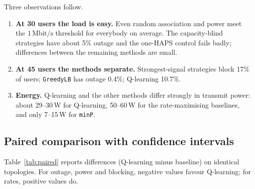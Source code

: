 \documentclass[11pt,a4paper]{article}
\newcommand{\Mbps}{\,\mathrm{Mbit/s}}
\begin{document}
Three observations follow.
\begin{enumerate}
  \item \textbf{At 30 users the load is easy.} Even random association and power meet the $1\Mbps$ threshold for everybody on average. The capacity-blind strategies have about 5\% outage and the one-HAPS control fails badly; differences between the remaining methods are small.
  \item \textbf{At 45 users the methods separate.} Strongest-signal strategies block 17\% of users; \texttt{GreedyLB} has outage 0.4\%; Q-learning 10.7\%.
  \item \textbf{Energy.} Q-learning and the other methods differ strongly in transmit power: about 29--30\,W for Q-learning, 50--60\,W for the rate-maximising baselines, and only 7--15\,W for \texttt{minP}.
\end{enumerate}

\subsection{Paired comparison with confidence intervals}
Table~\ref{tab:paired} reports differences (Q-learning minus baseline) on identical topologies. For outage, power and blocking, negative values favour Q-learning; for rates, positive values do.

\begin{table}[h]
\centering\footnotesize
{}
\caption{Paired differences, Q-learning minus baseline, mean with 95\% bootstrap CI over 30 topologies. pp = percentage points.}
\label{tab:paired}
\end{table}
\end{document}
